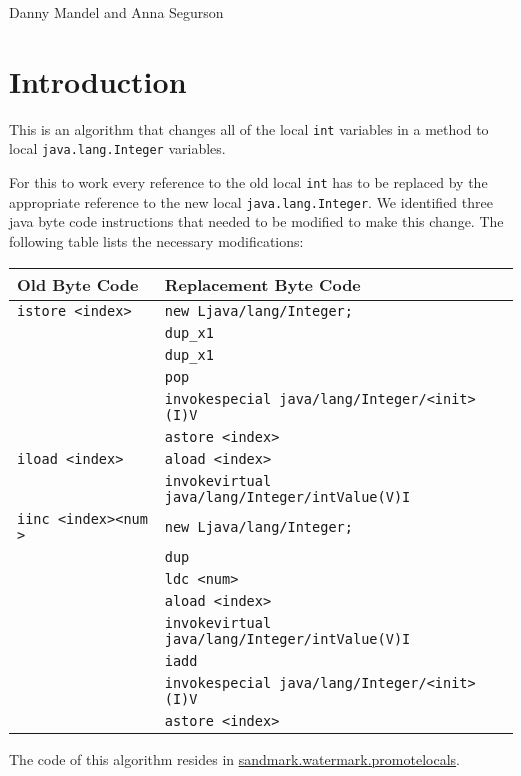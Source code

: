 %
          {Danny Mandel and Anna Segurson}

\section{Introduction}
This is an algorithm that changes all of the local \texttt{int} 
variables in a method to local \texttt{java.lang.Integer} variables.

For this to work every reference to the old local \texttt{int} has
to be replaced by the appropriate reference to the new local
\texttt{java.lang.Integer}. We identified three java byte code instructions
that needed to be modified to make this change. The following table lists the 
necessary modifications:

\begin{center}
\begin{tabular}{| l | l |}
   \hline
   Old Byte Code & Replacement Byte Code \\
   \hline
   \texttt{istore \textless index\textgreater} & \texttt{new Ljava/lang/Integer;} \\ 
      & \texttt{dup\_x1} \\
      & \texttt{dup\_x1} \\
      & \texttt{pop} \\
      & \texttt{invokespecial java/lang/Integer/\textless init\textgreater(I)V} \\
      & \texttt{astore \textless index\textgreater} \\
   \hline
   \texttt{iload \textless index\textgreater} & \texttt{aload \textless index\textgreater} \\
      & \texttt{invokevirtual java/lang/Integer/intValue(V)I} \\
   \hline
   \texttt{iinc \textless index\textgreater \textless num \textgreater} 
      & \texttt{new Ljava/lang/Integer;}  \\
      & \texttt{dup}  \\
      & \texttt{ldc \textless num\textgreater}   \\
      & \texttt{aload \textless index\textgreater}   \\
      & \texttt{invokevirtual java/lang/Integer/intValue(V)I}  \\
      & \texttt{iadd}  \\
      & \texttt{invokespecial java/lang/Integer/\textless init\textgreater (I)V } \\
      & \texttt{astore \textless index\textgreater}  \\
   \hline
\end{tabular}
\end{center}
The code of this algorithm
resides in \url{sandmark.watermark.promotelocals}.


